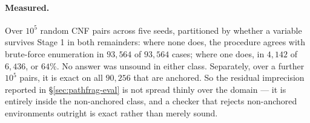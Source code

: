 \paragraph{Measured.}  Over $10^{5}$ random CNF pairs across five seeds,
partitioned by whether a variable survives Stage 1 in both remainders: where
none does, the procedure agrees with brute-force enumeration in $93{,}564$ of
$93{,}564$ cases; where one does, in $4{,}142$ of $6{,}436$, or $64\%$.  No
answer was unsound in either class.  Separately, over a further $10^{5}$ pairs,
it is exact on all $90{,}256$ that are anchored.  So the residual
imprecision reported in \S\ref{sec:pathfrag-eval} is not spread thinly over the
domain --- it is entirely inside the non-anchored class, and a checker that
rejects non-anchored environments outright is exact rather than
merely sound.
